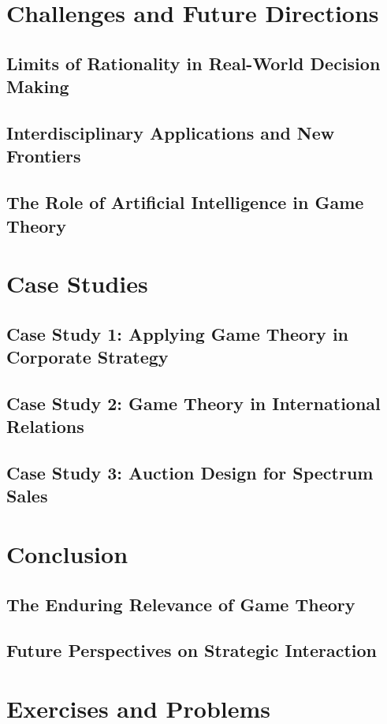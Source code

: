\documentclass[12pt]{book} %
\begin{document}
\section{Challenges and Future Directions}
\subsection{Limits of Rationality in Real-World Decision Making}
\subsection{Interdisciplinary Applications and New Frontiers}
\subsection{The Role of Artificial Intelligence in Game Theory}

\section{Case Studies}
\subsection{Case Study 1: Applying Game Theory in Corporate Strategy}
\subsection{Case Study 2: Game Theory in International Relations}
\subsection{Case Study 3: Auction Design for Spectrum Sales}

\section{Conclusion}
\subsection{The Enduring Relevance of Game Theory}
\subsection{Future Perspectives on Strategic Interaction}

\section{Exercises and Problems}
\end{document}
